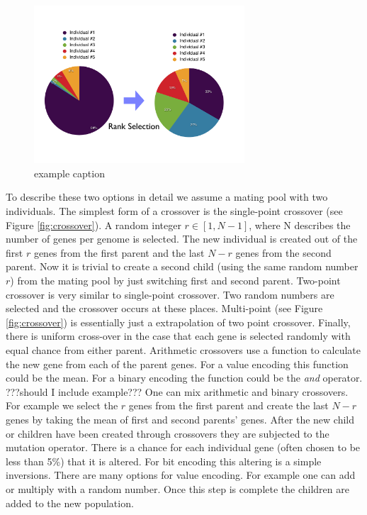 \begin{figure}[htbp] %
   \centering
   \includegraphics[width=0.7\textwidth]{chapter_dalek/plots/rank_select.pdf} 
   \caption{example caption}
   \label{fig:rankselection}
\end{figure}




To describe these two options in detail we assume a mating pool with two individuals. The simplest form of a crossover is the single-point crossover (see Figure \ref{fig:crossover}). A random integer $r \in [1,N-1]$, where N describes the number of genes per genome is selected. The new individual is created out of the first $r$ genes from the first parent and the last $N-r$ genes from the second parent. Now it is trivial to create a second child (using the same random number $r$) from the mating pool by just switching first and second parent. 
Two-point crossover is very similar to single-point crossover. Two random numbers are selected and the crossover occurs at these places. Multi-point (see Figure \ref{fig:crossover}) is essentially just a extrapolation of two point crossover. Finally, there is uniform cross-over in the case that each gene is selected randomly with equal chance from either parent.
Arithmetic crossovers use a function to calculate the new gene from each of the parent genes. For a value encoding this function could be the mean. For a binary encoding the function could be the \textit{and} operator. ???should I include example???
One can mix arithmetic and binary crossovers. For example we select the $r$ genes from the first parent and create the last $N-r$ genes by taking the mean of first and second parents' genes. 
After the new child or children have been created through crossovers they are subjected to the mutation operator. There is a chance for each individual gene (often chosen to be less than 5\%) that it is altered. For bit encoding this altering is a simple inversions. There are many options for value encoding. For example one can add or multiply with a random number. 
Once this step is complete the children are added to the new population.

